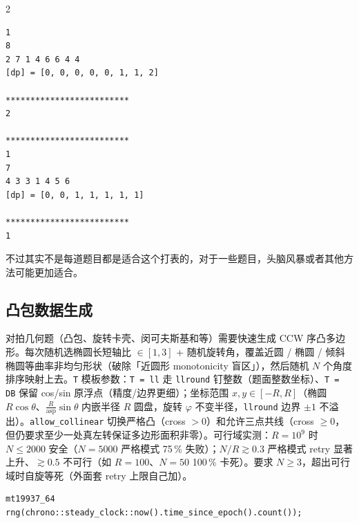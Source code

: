 \begin{multicols*}{2}
\begin{verbatim}
1
8
2 7 1 4 6 6 4 4 
[dp] = [0, 0, 0, 0, 0, 1, 1, 2]

*************************
2

*************************
1
7
4 3 3 1 4 5 6 
[dp] = [0, 0, 1, 1, 1, 1, 1]

*************************
1

	\end{verbatim}

	不过其实不是每道题目都是适合这个打表的，对于一些题目，头脑风暴或者其他方法可能更加适合。

	\subsection{凸包数据生成}

	对拍几何题（凸包、旋转卡壳、闵可夫斯基和等）需要快速生成 CCW 序凸多边形。每次随机选椭圆长短轴比 $\in [1, 3]$ + 随机旋转角，覆盖近圆 / 椭圆 / 倾斜椭圆等曲率非均匀形状（破除「近圆形 monotonicity 盲区」），然后随机 $N$ 个角度排序映射上去。\texttt{T} 模板参数：\texttt{T = ll} 走 \texttt{llround} 钉整数（题面整数坐标）、\texttt{T = DB} 保留 cos/sin 原浮点（精度/边界更细）；坐标范围 $x, y \in [-R, R]$（椭圆 $R \cos \theta$、$\tfrac{R}{\text{asp}}\sin \theta$ 内嵌半径 $R$ 圆盘，旋转 $\varphi$ 不变半径，\texttt{llround} 边界 $\pm 1$ 不溢出）。\texttt{allow\_collinear} 切换严格凸（cross $> 0$）和允许三点共线（cross $\ge 0$，但仍要求至少一处真左转保证多边形面积非零）。可行域实测：$R = 10^9$ 时 $N \le 2000$ 安全（$N = 5000$ 严格模式 75\,\% 失败）；$N/R \gtrsim 0.3$ 严格模式 retry 显著上升、$\gtrsim 0.5$ 不可行（如 $R = 100$、$N = 50$ 100\,\% 卡死）。要求 $N \ge 3$，超出可行域时自旋等死（外面套 retry 上限自己加）。

	\begin{verbatim}
mt19937_64 rng(chrono::steady_clock::now().time_since_epoch().count());


\end{verbatim}
\end{multicols*}
